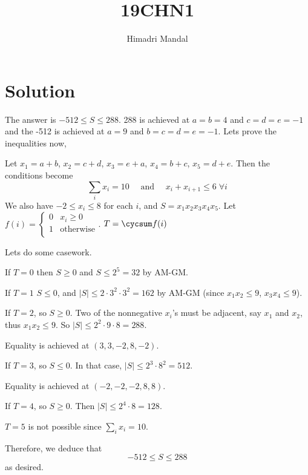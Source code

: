 \documentclass[11pt]{scrartcl}
\title{19CHN1}
\author{Himadri Mandal}
\begin{document}
\maketitle

\section{Solution}
\begin{soln}
	
\raggedright
The answer is $-512 \le S \le 288$.
288 is achieved at $a=b=4$ and $c=d=e=-1$ and 
the -512 is achieved at $a=9$ and $b=c=d=e=-1$.
Lets prove the inequalities now, 

Let $x_1 = a+b$, $x_2 = c+d$, $x_3 = e+a$, $x_4 = b+c$, $x_5 = d+e$.
Then the conditions become
\[ \sum_i x_i = 10 \quad\text{ and }\quad
	x_i + x_{i+1} \le 6 \; \forall i \]
We also have $-2 \le x_i \le 8$ for each $i$,
and $S = x_1 x_2 x_3 x_4 x_5$.
Let $f(i) = \begin{cases}
	0 & x_i \geq 0 \\
	1 & \text{otherwise} \\
\end{cases}
$.
$T = \cycsum f(i)$

Lets do some casework.
\begin{itemize}
	\ii If $T = 0$
	then $S \ge 0$ and $S \le 2^5 = 32$ by AM-GM.

	\ii If $T=1$ $S \le 0$,
	and $|S| \le 2 \cdot 3^2 \cdot 3^2 = 162$
	by AM-GM (since $x_1 x_2 \le 9$, $x_3 x_4 \le 9$).

	\ii If $T=2$, so $S \ge 0$.
	Two of the nonnegative $x_i$'s must be adjacent,
	say $x_1$ and $x_2$, thus $x_1 x_2 \le 9$.
	So $|S| \le 2^2 \cdot 9 \cdot 8 = 288$.

	Equality is achieved at $(3,3,-2,8,-2)$.

	\ii If $T=3$, so $S \le 0$.
	In that case, $|S| \le 2^3 \cdot 8^2 = 512$.

	Equality is achieved at $(-2,-2,-2,8,8)$.

	\ii If $T=4$, so $S \ge 0$.
	Then $|S| \le 2^4 \cdot 8 = 128$.

	\ii $T=5$ is not possible
	since $\sum_i x_i = 10$.
\end{itemize}
Therefore, we deduce that \[ -512 \le S \le 288 \] as desired.
\end{soln}
\end{document}
